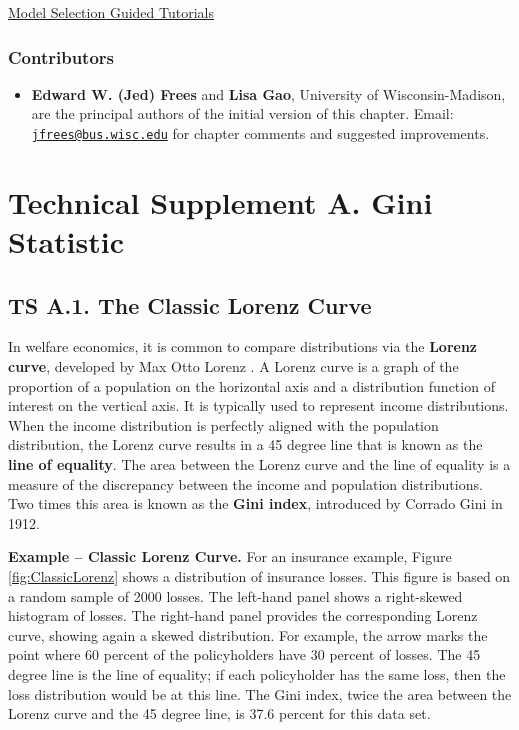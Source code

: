 \documentclass[]{book}
\providecommand{\tightlist}{%
  \setlength{\itemsep}{0pt}\setlength{\parskip}{0pt}}
\theoremstyle{definition}
\theoremstyle{definition}
\theoremstyle{definition}
\theoremstyle{remark}
\begin{document}
\href{http://www.ssc.wisc.edu/~jfrees/loss-data-analytics/loss-data-analytics-model-selection/}{Model
Selection Guided Tutorials}

\subsubsection*{Contributors}\label{contributors-3}

\begin{itemize}
\tightlist
\item
  \textbf{Edward W. (Jed) Frees} and \textbf{Lisa Gao}, University of
  Wisconsin-Madison, are the principal authors of the initial version of
  this chapter. Email:
  \href{mailto:jfrees@bus.wisc.edu}{\nolinkurl{jfrees@bus.wisc.edu}} for
  chapter comments and suggested improvements.
\end{itemize}

\section*{Technical Supplement A. Gini
Statistic}\label{technical-supplement-a.-gini-statistic}

\subsection*{TS A.1. The Classic Lorenz
Curve}\label{ts-a.1.-the-classic-lorenz-curve}

In welfare economics, it is common to compare distributions via the
\textbf{Lorenz curve}, developed by Max Otto Lorenz
\citep{lorenz1905methods}. A Lorenz curve is a graph of the proportion
of a population on the horizontal axis and a distribution function of
interest on the vertical axis. It is typically used to represent income
distributions. When the income distribution is perfectly aligned with
the population distribution, the Lorenz curve results in a 45 degree
line that is known as the \textbf{line of equality}. The area between
the Lorenz curve and the line of equality is a measure of the
discrepancy between the income and population distributions. Two times
this area is known as the \textbf{Gini index}, introduced by Corrado
Gini in 1912.

\textbf{Example -- Classic Lorenz Curve.} For an insurance example,
Figure \ref{fig:ClassicLorenz} shows a distribution of insurance losses.
This figure is based on a random sample of 2000 losses. The left-hand
panel shows a right-skewed histogram of losses. The right-hand panel
provides the corresponding Lorenz curve, showing again a skewed
distribution. For example, the arrow marks the point where 60 percent of
the policyholders have 30 percent of losses. The 45 degree line is the
line of equality; if each policyholder has the same loss, then the loss
distribution would be at this line. The Gini index, twice the area
between the Lorenz curve and the 45 degree line, is 37.6 percent for
this data set.
\end{document}
